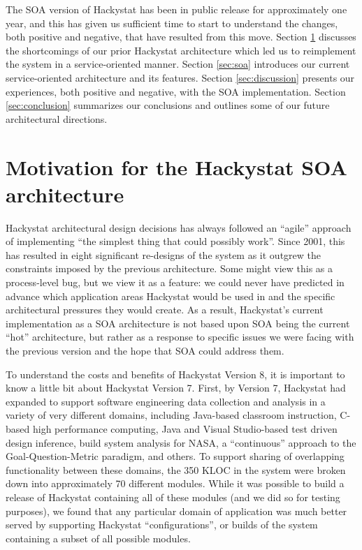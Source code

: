 \documentclass[conference,compsoc,peerreview]{IEEEtran}
\begin{document}
The SOA version of Hackystat has been in public release for approximately
one year, and this has given us sufficient time to start to understand the
changes, both positive and negative, that have resulted from this move.
Section \ref{sec:motivation} discusses the shortcomings of our prior
Hackystat architecture which led us to reimplement the system in a
service-oriented manner.  Section \ref{sec:soa} introduces our current
service-oriented architecture and its features.  Section
\ref{sec:discussion} presents our experiences, both positive and negative,
with the SOA implementation.  Section \ref{sec:conclusion} summarizes our
conclusions and outlines some of our future architectural directions.


\section{Motivation for the Hackystat SOA architecture}
\label{sec:motivation}

Hackystat architectural design decisions has always followed an ``agile''
approach of implementing ``the simplest thing that could possibly work''.
Since 2001, this has resulted in eight significant re-designs of the system
as it outgrew the constraints imposed by the previous architecture.  Some
might view this as a process-level bug, but we view it as a feature: we
could never have predicted in advance which application areas Hackystat
would be used in and the specific architectural pressures they would
create.  As a result, Hackystat's current implementation as a SOA
architecture is not based upon SOA being the current ``hot'' architecture,
but rather as a response to specific issues we were facing with the
previous version and the hope that SOA could address them.

To understand the costs and benefits of Hackystat Version 8, it is
important to know a little bit about Hackystat Version 7.  First, by
Version 7, Hackystat had expanded to support software engineering data
collection and analysis in a variety of very different domains, including
Java-based classroom instruction, C-based high performance computing, Java
and Visual Studio-based test driven design inference, build system analysis
for NASA, a ``continuous'' approach to the Goal-Question-Metric paradigm,
and others.  To support sharing of overlapping functionality between these
domains, the 350 KLOC in the system were broken down into approximately 70
different modules.  While it was possible to build a release of Hackystat
containing all of these modules (and we did so for testing purposes), we
found that any particular domain of application was much better served by
supporting Hackystat ``configurations'', or builds of the system containing
a subset of all possible modules.
\end{document}
